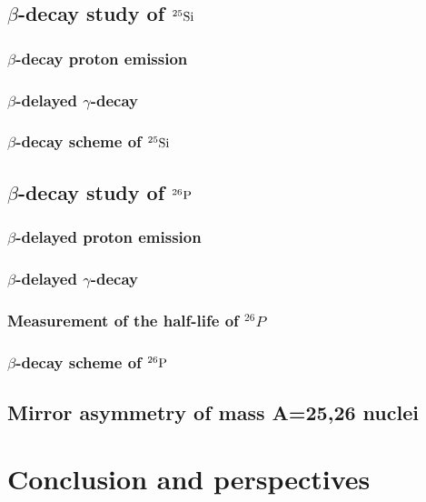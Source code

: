 \documentclass[UTF8]{ctexart}
\begin{document}
\subsection{$\beta$-decay study of $^{25}\textnormal{Si}$}
\subsubsection{$\beta$-decay proton emission}
\subsubsection{$\beta$-delayed $\gamma$-decay}
\subsubsection{$\beta$-decay scheme of $^{25}\textnormal{Si}$}
\subsection{$\beta$-decay study of $^{26}\textnormal{P}$}
\subsubsection{$\beta$-delayed proton emission}
\subsubsection{$\beta$-delayed $\gamma$-decay}
\subsubsection{Measurement of the half-life of $^{26}P$}
\subsubsection{$\beta$-decay scheme of $^{26}\textnormal{P}$}
\subsection{Mirror asymmetry of mass A=25,26 nuclei}
\section{Conclusion and perspectives}
\end{document}
